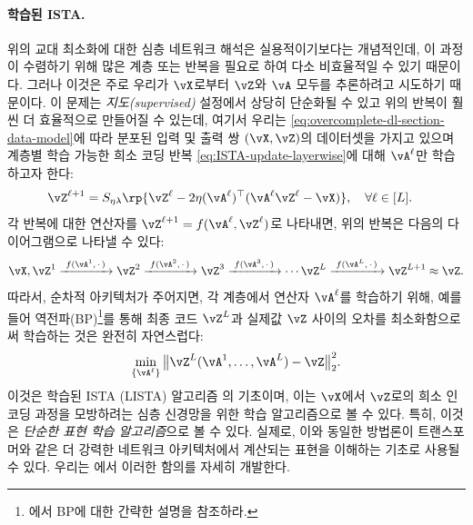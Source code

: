 \documentclass[../../book-main_ko.tex]{subfiles}
\begin{document}
\paragraph{학습된 ISTA.} 위의 교대 최소화에 대한 심층 네트워크 해석은 실용적이기보다는 개념적인데, 이 과정이 수렴하기 위해 많은 계층 또는 반복을 필요로 하여 다소 비효율적일 수 있기 때문이다. 그러나 이것은 주로 우리가 \(\vX\)로부터 \(\vZ\)와 \(\vA\) 모두를 추론하려고 시도하기 때문이다. 이 문제는 \textit{지도(supervised)} 설정에서 상당히 단순화될 수 있고 위의 반복이 훨씬 더 효율적으로 만들어질 수 있는데, 여기서 우리는 \eqref{eq:overcomplete-dl-section-data-model}에 따라 분포된 입력 및 출력 쌍 \((\vX, \vZ)\)의 데이터셋을 가지고 있으며 계층별 학습 가능한 희소 코딩 반복 \eqref{eq:ISTA-update-layerwise}에 대해 \(\vA^\ell\)만 학습하고자 한다:
\begin{align}
    & \vZ^{\ell + 1} = S_{\eta\lambda}\rp{\vZ^{\ell} - 2\eta(\vA^{\ell})^{\top}(\vA^\ell\vZ^{\ell} - \vX)}, \quad \forall \ell \in [L].
\end{align}
각 반복에 대한 연산자를 $\vZ^{\ell + 1} = f(\vA^\ell, \vZ^\ell)$로 나타내면, 위의 반복은 다음의 다이어그램으로 나타낼 수 있다:
\begin{equation*}
\vX, \vZ^1 \xrightarrow{\hspace{1mm} f(\vA^1,\,\cdot\,) \hspace{1mm}}  \vZ^2 \xrightarrow{\hspace{1mm} f(\vA^2,\,\cdot\,) \hspace{1mm}}  \vZ^3  \xrightarrow{\hspace{1mm} f(\vA^3,\,\cdot\,) \hspace{1mm}} \cdots \vZ^{L}  \xrightarrow{\hspace{1mm} f(\vA^{L},\,\cdot\,) \hspace{1mm}} \vZ^{L + 1} \approx \vZ.
\label{eqn:deep-sparse-encoding}
\end{equation*}
따라서, 순차적 아키텍처가 주어지면, 각 계층에서 연산자 \(\vA^\ell\)를 학습하기 위해, 예를 들어 역전파(BP)\footnote{에서 BP에 대한 간략한 설명을 참조하라.}를 통해 최종 코드 $\vZ^L$과 실제값 $\vZ$ 사이의 오차를 최소화함으로써 학습하는 것은 완전히 자연스럽다:
\begin{equation}\label{eq:lista-training}
    \min_{\{\vA^\ell\}} \big\|\vZ^L(\vA^1, \ldots, \vA^{L}) - \vZ\big\|_2^2.
\end{equation}
이것은 학습된 ISTA (LISTA) 알고리즘 \cite{gregor2010learning}의 기초이며, 이는 $\vX$에서 $\vZ$로의 희소 인코딩 과정을 모방하려는 심층 신경망을 위한 학습 알고리즘으로 볼 수 있다. 특히, 이것은 \textit{단순한 표현 학습 알고리즘}으로 볼 수 있다. 실제로, 이와 동일한 방법론이 트랜스포머와 같은 더 강력한 네트워크 아키텍처에서 계산되는 표현을 이해하는 기초로 사용될 수 있다. 우리는 에서 이러한 함의를 자세히 개발한다.
\end{document}
